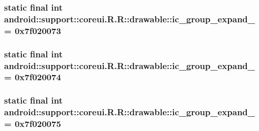 \hypertarget{classandroid_1_1support_1_1coreui_1_1_r_1_1drawable_3a8bac53f2f05392269f20707f74cf87}{
\subsubsection[{ic\_\-group\_\-expand\_\-04}]{\setlength{\rightskip}{0pt plus 5cm}static final int android::support::coreui.R.R::drawable::ic\_\-group\_\-expand\_ = 0x7f020073}}
\label{classandroid_1_1support_1_1coreui_1_1_r_1_1drawable_3a8bac53f2f05392269f20707f74cf87}


\hypertarget{classandroid_1_1support_1_1coreui_1_1_r_1_1drawable_6718646079c7317266414f8e42b70c00}{
\subsubsection[{ic\_\-group\_\-expand\_\-05}]{\setlength{\rightskip}{0pt plus 5cm}static final int android::support::coreui.R.R::drawable::ic\_\-group\_\-expand\_ = 0x7f020074}}
\label{classandroid_1_1support_1_1coreui_1_1_r_1_1drawable_6718646079c7317266414f8e42b70c00}


\hypertarget{classandroid_1_1support_1_1coreui_1_1_r_1_1drawable_ba79f0002ce52bf39419af0c0926db2b}{
\subsubsection[{ic\_\-group\_\-expand\_\-06}]{\setlength{\rightskip}{0pt plus 5cm}static final int android::support::coreui.R.R::drawable::ic\_\-group\_\-expand\_ = 0x7f020075}}
\label{classandroid_1_1support_1_1coreui_1_1_r_1_1drawable_ba79f0002ce52bf39419af0c0926db2b}


